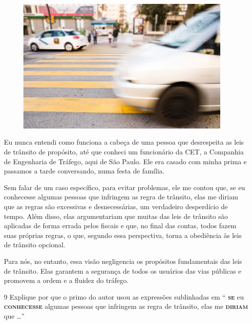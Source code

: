 \begin{myquote}

\begin{figure}[H]
\centering
\includegraphics[width=0.95\textwidth]{./imgSAEB_7_POR/media/image50.png}
\end{figure}

Eu nunca entendi como funciona a cabeça de uma pessoa que desrespeita as leis
de trânsito de propósito, até que conheci um funcionário da CET, a Companhia
de Engenharia de Tráfego, aqui de São Paulo. Ele era casado com minha prima e
passamos a tarde conversando, numa festa de família. 

Sem falar de um caso específico, para evitar problemas, ele me contou que, se
eu conhecesse algumas pessoas que infringem as regra de trânsito,
elas me diriam que as regras são excessivas e desnecessárias, um
verdadeiro desperdício de tempo. Além disso, elas argumentariam que muitas das
leis de trânsito são aplicadas de forma errada pelos fiscais e que, no final
das contas, todos fazem suas próprias regras, o que, segundo essa perspectiva,
torna a obediência às leis de trânsito opcional.

Para nós, no entanto, essa visão negligencia os propósitos fundamentais das leis 
de trânsito. Elas garantem a segurança de todos os usuários das vias públicas e 
promovem a ordem e a fluidez do tráfego.


\end{myquote}

\num{9} Explique por que o primo do autor usou as expressões sublinhadas em  
`` \textsc{\textbf{se}} eu \textsc{\textbf{conhecesse}} algumas pessoas que 
infringem as regra de trânsito, elas me \textsc{\textbf{diriam}} que \ldots{}''

